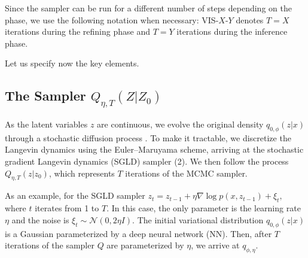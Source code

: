 Since the sampler can be run for a different number of steps depending on the phase, we use the following notation when necessary: VIS-$X$-$Y$ denotes $T = X$ iterations during the refining phase and $T=Y$ iterations during the inference phase.


Let us specify now the key elements.

\subsection{The Sampler $Q_{ \eta, T}(Z|Z_0)$ } \label{sec:grad}

{ As the latent variables $z$ are continuous}, %
we evolve the original density $q_{0,\phi}(z|x)$ through a stochastic diffusion process \cite{pavliotis2014stochastic}. To make it tractable, we discretize the Langevin dynamics using the Euler--Maruyama scheme, arriving at the stochastic gradient Langevin dynamics (SGLD) sampler (2). %
We then follow the process $Q_{\eta,T} (z | z_0)$,
which represents $T$ iterations of the MCMC sampler. 

As an example, for the SGLD sampler $z_t = z_{t-1} + \eta \nabla \log p(x, z_{t-1}) + \xi_{t},$ where $t$ iterates from 1 to $T$. In this case, the only parameter
is the learning rate $\eta$ and the noise is $\xi_t \sim \mathcal{N}(0, 2\eta I)$. %
The initial variational distribution $q_{0, \phi}(z|x)$ is a Gaussian parameterized by a deep neural network (NN). Then, after $T$ iterations of the sampler $Q$ are parameterized by $\eta$, we arrive at $q_{\phi, \eta}$. 

